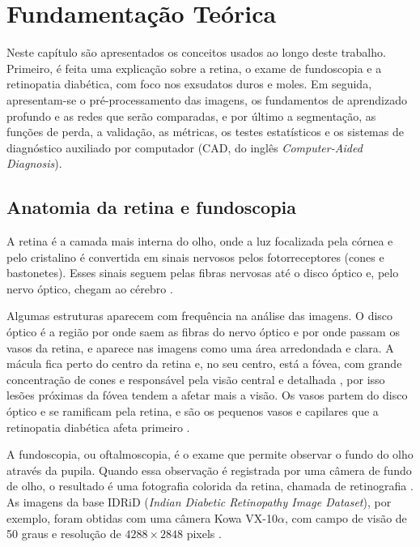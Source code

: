 \chapter{Fundamentação Teórica}
\label{cap:fundamentacao-teorica}

Neste capítulo são apresentados os conceitos usados ao longo deste trabalho. Primeiro, é feita uma explicação sobre a retina, o exame de fundoscopia e a retinopatia diabética, com foco nos exsudatos duros e moles. Em seguida, apresentam-se o pré-processamento das imagens, os fundamentos de aprendizado profundo e as redes que serão comparadas, e por último a segmentação, as funções de perda, a validação, as métricas, os testes estatísticos e os sistemas de diagnóstico auxiliado por computador (CAD, do inglês \textit{Computer-Aided Diagnosis}).

\section{Anatomia da retina e fundoscopia}
\label{sec:anatomia-retina}

A retina é a camada mais interna do olho, onde a luz focalizada pela córnea e pelo cristalino é convertida em sinais nervosos pelos fotorreceptores (cones e bastonetes). Esses sinais seguem pelas fibras nervosas até o disco óptico e, pelo nervo óptico, chegam ao cérebro \cite{abramoff2010retinal}.

Algumas estruturas aparecem com frequência na análise das imagens. O disco óptico é a região por onde saem as fibras do nervo óptico e por onde passam os vasos da retina, e aparece nas imagens como uma área arredondada e clara. A mácula fica perto do centro da retina e, no seu centro, está a fóvea, com grande concentração de cones e responsável pela visão central e detalhada \cite{abramoff2010retinal}, por isso lesões próximas da fóvea tendem a afetar mais a visão. Os vasos partem do disco óptico e se ramificam pela retina, e são os pequenos vasos e capilares que a retinopatia diabética afeta primeiro \cite{cheung2010dr}.

A fundoscopia, ou oftalmoscopia, é o exame que permite observar o fundo do olho através da pupila. Quando essa observação é registrada por uma câmera de fundo de olho, o resultado é uma fotografia colorida da retina, chamada de retinografia \cite{abramoff2010retinal}. As imagens da base IDRiD (\textit{Indian Diabetic Retinopathy Image Dataset}), por exemplo, foram obtidas com uma câmera Kowa VX-10$\alpha$, com campo de visão de 50 graus e resolução de $4288 \times 2848$ pixels \cite{porwal2018idrid}.

